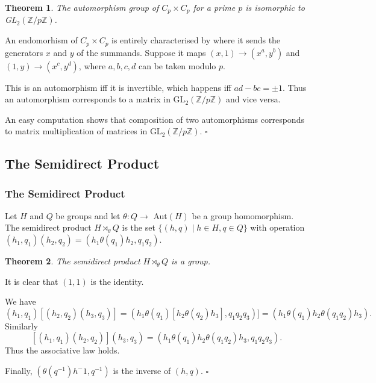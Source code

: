 \documentclass[10pt]{article}
\newtheorem{theorem}{Theorem}[section]
\newenvironment{proof}[1][Proof]{\begin{trivlist}
\item[\hskip \labelsep {\itshape #1}]}{\end{trivlist}}
\newenvironment{definition}[1][Definition]{\begin{trivlist}
\item[\hskip \labelsep {\bfseries #1}]}{\end{trivlist}}
\begin{document}
\begin{theorem}
The automorphism group of $C_p\times C_p$ for a prime $p$ is isomorphic to GL$_2(\mathbb{Z}/p\mathbb{Z})$.
\end{theorem}

\begin{proof}
An endomorhism of $C_p\times C_p$ is entirely characterised by where it sends the generators $x$ and $y$ of the summands. Suppose it maps $(x, 1) \to (x^a, y^b)$ and $(1, y) \to (x^c, y^d)$, where $a, b, c, d$ can be taken modulo $p$.

This is an automorphism iff it is invertible, which happens iff $ad - bc = \pm 1$. Thus an automorphism corresponds to a matrix in GL$_2(\mathbb{Z}/p\mathbb{Z})$ and vice versa.

An easy computation shows that composition of two automorphisms corresponds to matrix multiplication of matrices in GL$_2(\mathbb{Z}/p\mathbb{Z})$. $\square$
\end{proof}

\subsection{The Semidirect Product}

\subsubsection{The Semidirect Product}

\begin{definition}
Let $H$ and $Q$ be groups and let $\theta : Q \to$ Aut$(H)$ be a group homomorphism. The semidirect product $H\rtimes_{\theta} Q$ is the set $\{(h, q)\;|\; h \in H, q \in Q\}$ with operation $(h_1, q_1)(h_2, q_2) = (h_1\theta(q_1)h_2, q_1q_2)$.
\end{definition}

\begin{theorem}
The semidirect product $H\rtimes_{\theta} Q$ is a group.
\end{theorem}

\begin{proof}
It is clear that $(1, 1)$ is the identity.

We have
$$(h_1, q_1)[(h_2, q_2)(h_3, q_3)] = (h_1\theta(q_1)[h_2\theta(q_2)h_3], q_1q_2q_3)] = (h_1\theta(q_1)h_2\theta(q_1q_2)h_3).$$
Similarly
$$[(h_1, q_1)(h_2, q_2)](h_3, q_3) = (h_1\theta(q_1)h_2\theta(q_1q_2)h_3, q_1q_2q_3).$$
Thus the associative law holds.

Finally, $(\theta(q^{-1})h^-1, q^{-1})$ is the inverse of $(h, q)$.
$\square$
\end{proof}
\end{document}
